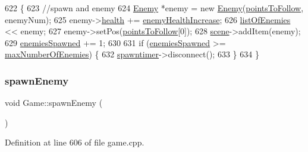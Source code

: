 \begin{DoxyCode}
622 \{
623     \textcolor{comment}{//spawn and enemy}
624     \hyperlink{class_enemy}{Enemy} *enemy = \textcolor{keyword}{new} \hyperlink{class_enemy}{Enemy}(\hyperlink{class_game_abe95b23433c0353887099928a5573c59}{pointsToFollow}, enemyNum);
625     enemy->\hyperlink{class_enemy_aedd5e7bf8ef07ee97be433c853a10d8d}{health} += \hyperlink{class_game_ac0038cbbcfbd5d8b32600cd9f42cd09b}{enemyHealthIncrease};
626     \hyperlink{class_game_ab96914bfc1e59035233105abfb0787fe}{listOfEnemies} << enemy;
627     enemy->setPos(\hyperlink{class_game_abe95b23433c0353887099928a5573c59}{pointsToFollow}[0]);
628     \hyperlink{class_game_a8119e3b9a632906c6808fa294b46a92a}{scene}->addItem(enemy);
629     \hyperlink{class_game_a6ac18c388eda83ceb3212e099b3b8473}{enemiesSpawned} += 1;
630 
631     \textcolor{keywordflow}{if} (\hyperlink{class_game_a6ac18c388eda83ceb3212e099b3b8473}{enemiesSpawned} >= \hyperlink{class_game_aaee1756450bae685777ee86c45ef4f78}{maxNumberOfEnemies}) \{
632         \hyperlink{class_game_a4a8895723160ca3585fe140e476aea1f}{spawntimer}->disconnect();
633     \}
634 \}
\end{DoxyCode}
\mbox{\label{class_game_ad7a4181414089729ddea00c053f822c4}} 
\subsubsection{\texorpdfstring{spawn\+Enemy}{spawnEnemy}\hspace{0.1cm}{\footnotesize\ttfamily [2/2]}}
{\footnotesize\ttfamily void Game\+::spawn\+Enemy (\begin{DoxyParamCaption}{ }\end{DoxyParamCaption})\hspace{0.3cm}{\ttfamily [slot]}}



Definition at line 606 of file game.\+cpp.


